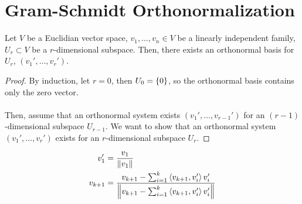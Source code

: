 \documentclass[letterpaper,12pt]{article}
\begin{document}
\section*{Gram-Schmidt Orthonormalization}
\begin{theorem}
Let $V$ be a Euclidian vector space, $v_1, \dots, v_n \in V$ be a linearly independent family, $U_r \subset V$ be a $r$-dimensional subspace. Then, there exists an orthonormal basis for $U_r$, $(v_1', \dots, v_r')$.

\begin{proof}
By induction, let $r = 0$, then $U_0 = \left\{ 0 \right\}$, so the orthonormal basis contains only the zero vector.
\\ \\ Then, assume that an orthonormal system exists $(v_1', \dots, v_{r-1}')$ for an $(r-1)$-dimensional subspace $U_{r-1}$. We want to show that an orthonormal system $(v_1', \dots, v_r')$ exists for an $r$-dimensional subspace $U_r$.
\end{proof}


\begin{align*}
    v_1' & = \dfrac{v_1}{\left\lVert v_1 \right\rVert} \\
    v_{k+1} & = \dfrac{v_{k+1} - \sum_{i=1}^k \left< v_{k+1}, v_i' \right> v_i'}{\left\lVert v_{k+1} - \sum_{i=1}^k \left< v_{k+1}, v_i' \right> v_i' \right\rVert}
\end{align*}
\end{theorem}
\end{document}
